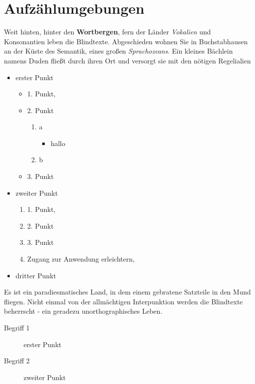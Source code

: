 \documentclass[%
	12pt,%
	a4paper,%
	oneside,%
	listof=totoc,
 	index=totoc,
	bibliography = totoc,
	parskip = half,%
	chapterprefix=false,%
	appendixprefix, %
headings=small,%
]{scrreprt}
\begin{document}
\chapter{Aufzählumgebungen}
\label{sec:Aufzaehlumgebung}

Weit hinten, hinter den \textbf{Wortbergen}, fern der Länder \textit{Vokalien} und Konsonantien leben die Blindtexte. Abgeschieden wohnen Sie in Buchstabhausen an der Küste des Semantik, eines großen \textsl{Sprachozeans}. Ein kleines Bächlein namens Duden fließt durch ihren Ort und versorgt sie mit den nötigen Regelialien %

\begin{itemize}
	\item erster Punkt
	\begin{itemize}
		\item 1. Punkt,
		\item 2. Punkt
		\begin{enumerate}
			\item a
			\begin{itemize}
				\item hallo
			\end{itemize}
						\item b
		\end{enumerate}
		\item 3. Punkt
	\end{itemize}
	\item zweiter Punkt
	\begin{enumerate}
		\item 1. Punkt,
		\item 2. Punkt
		\item 3. Punkt
		\item Zugang zur Anwendung erleichtern,
	\end{enumerate}
	\item dritter Punkt
\end{itemize}

Es ist ein paradiesmatisches Land, in dem einem gebratene Satzteile in den Mund fliegen. Nicht einmal von der allmächtigen Interpunktion werden die Blindtexte beherrscht - ein geradezu unorthographisches Leben. 

\begin{description}
	\item[Begrif\/f 1] erster Punkt
	\item[Begrif\/f 2] zweiter Punkt 
\end{description}
\end{document}
